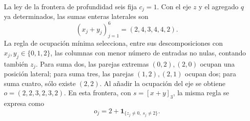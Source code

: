 La ley de la frontera de profundidad seis fija \(c_j=1\). Con el eje \(z\) y el
agregado \(q\) ya determinados, las sumas enteras laterales son
\[
 (x_j+y_j)_{j=1}^6=(2,4,3,4,4,2).
\]
La regla de ocupación mínima selecciona, entre sus descomposiciones con
\(x_j,y_j\in\{0,1,2\}\), las columnas con menor número de entradas
no nulas, contando también \(z_j\). Para suma dos, las parejas extremas
\((0,2),(2,0)\) ocupan una posición lateral; para suma tres, las parejas
\((1,2),(2,1)\) ocupan dos; para suma cuatro, sólo existe \((2,2)\).
Al añadir la ocupación del eje se obtiene \(o=(2,2,3,2,3,2)\).
En esta frontera, con \(s=[x+y]_3\), la misma regla se expresa como
\[
 o_j=2+\mathbf1_{\{z_j\ne0,\ s_j\ne2\}}.
\]
